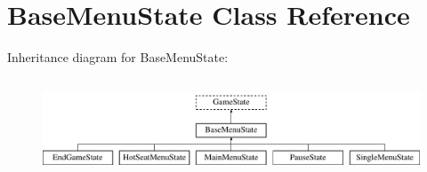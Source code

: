 \hypertarget{class_base_menu_state}{}\section{Base\+Menu\+State Class Reference}
\label{class_base_menu_state}
Inheritance diagram for Base\+Menu\+State\+:\begin{figure}[H]
\begin{center}
\leavevmode
\includegraphics[height=3.000000cm]{class_base_menu_state}
\end{center}
\end{figure}
